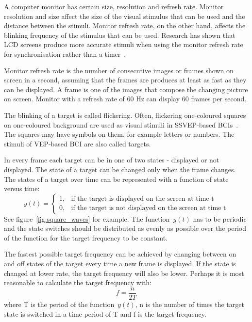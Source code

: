 A computer monitor has certain size, resolution and refresh rate. Monitor resolution and size affect the size of the visual stimulus that can be used and the distance between the stimuli. Monitor refresh rate, on the other hand, affects the blinking frequency of the stimulus that can be used. Research has shown that LCD screens produce more accurate stimuli when using the monitor refresh rate for synchronisation rather than a timer~\cite{lcd_lcd_led}.

Monitor refresh rate is the number of consecutive images or frames shown on screen in a second, assuming that the frames are produces at least as fast as they can be displayed. A frame is one of the images that compose the changing picture on screen. Monitor with a refresh rate of 60 Hz can display 60 frames per second. 

The blinking of a target is called flickering. Often, flickering one-coloured squares on one-coloured background are used as visual stimuli in \gls{SSVEP}-based \glspl{BCI}~\cite{ssvep_stim}. The squares may have symbols on them, for example letters or numbers. The stimuli of \gls{VEP}-based \gls{BCI} are also called targets.

In every frame each target can be in one of two states - displayed or not displayed. The state of a target can be changed only when the frame changes. The states of a target over time can be represented with a function of state versus time:
\begin{equation}
	\label{eq:state_vs_time}
	y(t)=
	\begin{cases}
		1,	&\mbox{if the target is displayed on the screen at time t}\\
		0,	&\mbox{if the target is not displayed on the screen at time t}
	\end{cases}
\end{equation}
See figure~\ref{fig:square_waves} for example. The function~$y(t)$ has to be periodic and the state switches should be distributed as evenly as possible over the period of the function for the target frequency to be constant.

The fastest possible target frequency can be achieved by changing between on and off states of the target every time a new frame is displayed. If the state is changed at lower rate, the target frequency will also be lower. Perhaps it is most reasonable to calculate the target frequency with:
\begin{equation}
	f = \frac{n}{2T}
\end{equation}
where T is the period of the function~$y(t)$, n is the number of times the target state is switched in a time period of T and f is the target frequency.

